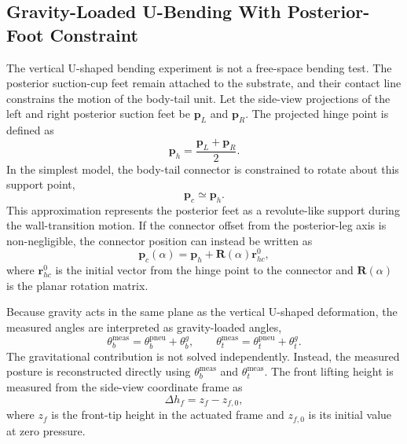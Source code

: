 \subsection{Gravity-Loaded U-Bending With Posterior-Foot Constraint}

The vertical U-shaped bending experiment is not a free-space bending test. The posterior suction-cup feet remain attached to the substrate, and their contact line constrains the motion of the body-tail unit. Let the side-view projections of the left and right posterior suction feet be $\mathbf{p}_L$ and $\mathbf{p}_R$. The projected hinge point is defined as
\begin{equation}
  \mathbf{p}_h = \frac{\mathbf{p}_L+\mathbf{p}_R}{2}.
  \label{eqn:posterior_hinge_point}
\end{equation}
In the simplest model, the body-tail connector is constrained to rotate about this support point,
\begin{equation}
  \mathbf{p}_c \simeq \mathbf{p}_h .
  \label{eqn:connector_hinge_constraint}
\end{equation}
This approximation represents the posterior feet as a revolute-like support during the wall-transition motion. If the connector offset from the posterior-leg axis is non-negligible, the connector position can instead be written as
\begin{equation}
  \mathbf{p}_c(\alpha) =
  \mathbf{p}_h + \mathbf{R}(\alpha)\mathbf{r}_{hc}^{0},
  \label{eqn:hinge_offset_model}
\end{equation}
where $\mathbf{r}_{hc}^{0}$ is the initial vector from the hinge point to the connector and $\mathbf{R}(\alpha)$ is the planar rotation matrix.

Because gravity acts in the same plane as the vertical U-shaped deformation, the measured angles are interpreted as gravity-loaded angles,
\begin{equation}
  \theta_b^{\mathrm{meas}} =
  \theta_b^{\mathrm{pneu}} + \theta_b^{g},
  \qquad
  \theta_t^{\mathrm{meas}} =
  \theta_t^{\mathrm{pneu}} + \theta_t^{g}.
  \label{eqn:gravity_loaded_angles}
\end{equation}
The gravitational contribution is not solved independently. Instead, the measured posture is reconstructed directly using $\theta_b^{\mathrm{meas}}$ and $\theta_t^{\mathrm{meas}}$. The front lifting height is measured from the side-view coordinate frame as
\begin{equation}
  \Delta h_f = z_f-z_{f,0},
  \label{eqn:front_height_change}
\end{equation}
where $z_f$ is the front-tip height in the actuated frame and $z_{f,0}$ is its initial value at zero pressure.

